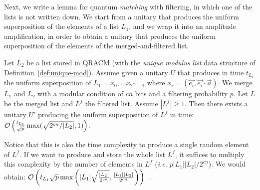 Next, we write a lemma for quantum \emph{matching} with filtering, in which one of the lists is not written down. We start from a unitary that produces the uniform superposition of the elements of a list $L_1$, and we wrap it into an amplitude amplification, in order to obtain a unitary that produces the uniform superposition of the elements of the merged-and-filtered list.


\begin{lemma}\label{lemma:quantum-matching-filtering}
Let $L_2$ be a list stored in QRACM (with the \emph{unique modulus list} data structure of Definition~\ref{def:unique-mod}). Assume given a unitary $U$ that produces in time $t_{L_1}$ the uniform superposition of $L_1 = x_0, \ldots x_{2^m -1}$ where $x_i = (\vec{e_i}, \vec{e_i} \cdot \vec{a})$.
We merge $L_1$ and $L_2$ with a modular condition of $cn$ bits and a filtering probability $p$. Let $L$ be the merged list and $L^f$ the filtered list. Assume $|L^f| \geq 1$. Then there exists a unitary $U'$ producing the uniform superposition of $L^f$ in time: $\mathcal{O} \left( \frac{t_{L_1}}{\sqrt{p}} \max( \sqrt{2^{cn} / |L_2|} , 1 )  \right)$.
\end{lemma}

Notice that this is also the time complexity to produce a single random element of $L^f$. If we want to produce and store the whole list $L^f$, it suffices to multiply this complexity by the number of elements in $L^f$ (\emph{i.e.} $p|L_1||L_2|/2^{cn}$). We would obtain: $\mathcal{O} \left( t_{L_1} \sqrt{p} \max \left( |L_1| \sqrt{\frac{|L_2|}{2^{cn}}}  , \frac{|L_1| |L_2|}{2^{cn}} \right)  \right) \enspace.$

